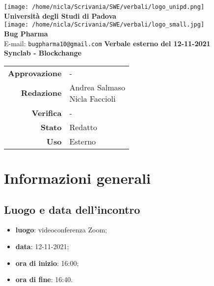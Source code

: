 \documentclass[11pt]{article}
\begin{document}
	\thispagestyle{empty}
	\begin{titlepage}
		\begin{center}
			\texttt{[image: /home/nicla/Scrivania/SWE/verbali/logo\_unipd.png]}\\
			\large \textbf{Università degli Studi di Padova} \\
			\vfill
			\texttt{[image: /home/nicla/Scrivania/SWE/verbali/logo\_small.jpg]}\\
			\large \textbf{Bug Pharma} \\
			\vfill
			\large
			E-mail: 
			\texttt{bugpharma10@gmail.com}
			\vfill
			\Huge \textbf{Verbale esterno del 12-11-2021}\\
			\large \textbf{Synclab - Blockchange}\\
			
			
			\vfill
			
			
			\begin{tabular}{r|l}
				\textbf{Approvazione} &  -\\
				\textbf{Redazione} &  \parbox[t]{5cm}{Andrea Salmaso \\Nicla Faccioli}\\
				\textbf{Verifica} &  -\\
				\textbf{Stato} & Redatto \\
				\textbf{Uso} & Esterno
			\end{tabular}
			\vfill
			
		\end{center}
	\end{titlepage}
	
	\section{Informazioni generali}
		\subsection{Luogo e data dell'incontro}
			\begin{itemize}
				\item \textbf{luogo}: videoconferenza Zoom;
				\item \textbf{data}: 12-11-2021;
				\item \textbf{ora di inizio}: 16:00;
				\item \textbf{ora di fine}: 16:40.
			\end{itemize}
		
\end{document}

